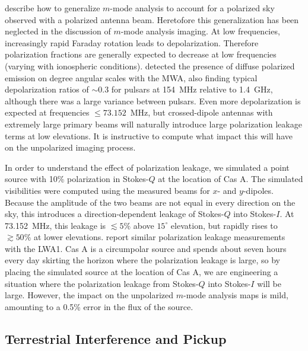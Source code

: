 \documentclass[twocolumn]{aastex61}
\begin{document}
\citet{2015PhRvD..91h3514S} describe how to generalize $m$-mode analysis to account for a polarized
sky observed with a polarized antenna beam. Heretofore this generalization has been neglected in the
discussion of $m$-mode analysis imaging.  At low frequencies, increasingly rapid Faraday rotation
leads to depolarization. Therefore polarization fractions are generally expected to decrease at low
frequencies (varying with ionospheric conditions). \citet{2016ApJ...830...38L} detected the presence
of diffuse polarized emission on degree angular scales with the MWA, also finding typical
depolarization ratios of $\sim0.3$ for pulsars at 154~MHz relative to 1.4~GHz, although there was a
large variance between pulsars. Even more depolarization is expected at frequencies $\le
73.152$~MHz, but crossed-dipole antennas with extremely large primary beams will naturally introduce
large polarization leakage terms at low elevations.  It is instructive to compute what impact this
will have on the unpolarized imaging process.

In order to understand the effect of polarization leakage, we simulated a point source with 10\%
polarization in Stokes-$Q$ at the location of Cas A.  The simulated visibilities were computed using
the measured beams for $x$- and $y$-dipoles. Because the amplitude of the two beams are not equal in
every direction on the sky, this introduces a direction-dependent leakage of Stokes-$Q$ into
Stokes-$I$. At 73.152~MHz, this leakage is $\lesssim5\%$ above $15^\circ$ elevation, but rapidly
rises to $\gtrsim50\%$ at lower elevations. \citet{2015JAI.....450004O} report similar polarization
leakage measurements with the LWA1.  Cas A is a circumpolar source and spends about seven hours
every day skirting the horizon where the polarization leakage is large, so by placing the simulated
source at the location of Cas A, we are engineering a situation where the polarization leakage from
Stokes-$Q$ into Stokes-$I$ will be large. However, the impact on the unpolarized $m$-mode analysis
maps is mild, amounting to a 0.5\% error in the flux of the source.

\subsection{Terrestrial Interference and Pickup}\label{sec:rfi}
\end{document}
